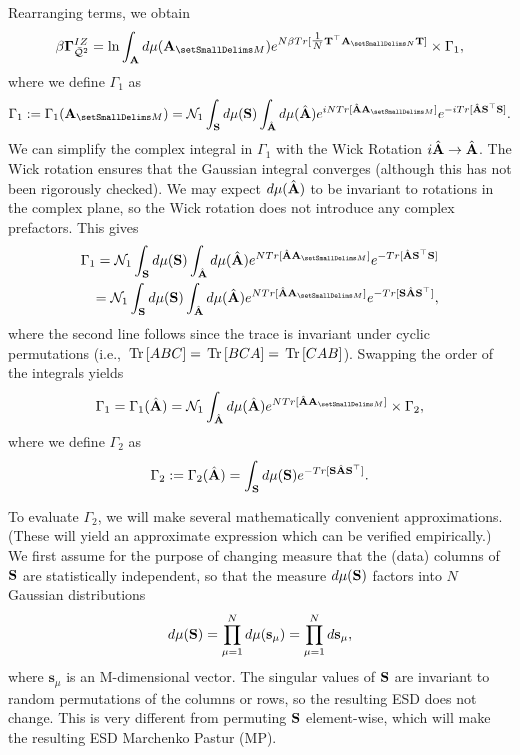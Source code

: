 Rearranging terms, we obtain 
\begin{align}
\label{eqn:IZG_Gamma1}
\IZG =  \ln\INTA  d\mu(\AMATM) 
            e^{  N\beta Tr[\tfrac{1}{N} \TMAT^{\top}\AMATN\TMAT ] } \times
           \Gamma_1,
\end{align}
where we define $\Gamma_1$ as 
\begin{align}
\Gamma_1 := \Gamma_1(\AMATM) 
         = \NORM_1 \INTS d\mu(\SMAT) 
                           \INTAHAT d\mu(\AHAT) e^{ iN Tr[ \AHAT\AMATM ] }
                                                           e^{ -i Tr[ \AHAT\SMAT^{\top} \SMAT ] } .
\end{align}
We can simplify the complex integral in $\Gamma_1$ with the Wick Rotation $i\hat{\mathbf{A}}\rightarrow\hat{\mathbf{A}}$.
The Wick rotation ensures that the Gaussian integral converges (although this has not been rigorously checked).
We may expect $d\mu(\hat{\mathbf{A}})$ to be invariant to rotations in the complex plane,
so the Wick rotation does not introduce any complex prefactors. This gives
\begin{eqnarray}
\label{eqn:QWick}
\Gamma_1 = \NORM_1 \INTS d\mu(\SMAT)\INTAHAT d\mu(\AHAT) 
           e^{ N  Tr[ \AHAT\AMATM ] }
           e^{ - Tr[ \AHAT\SMAT^{\top} \SMAT] } \\
\label{eqn:QWick2}
         = \NORM_1 \INTS d\mu(\SMAT)\INTAHAT d\mu(\AHAT) 
           e^{ N  Tr[ \AHAT\AMATM ] }
           e^{ -Tr[ \SMAT\AHAT\SMAT^{\top} ] } ,
\end{eqnarray}
where the second line follows since the trace is invariant under cyclic permutations (i.e., $\mbox{}\operatorname{Tr}\left[ABC\right]=\mbox{}\operatorname{Tr}\left[BCA\right]=\mbox{}\operatorname{Tr}\left[CAB\right]$).
Swapping the order of the integrals yields
\begin{eqnarray}
\label{eqn:QWick3}
\Gamma_1 =\Gamma_1(\AHAT)  = \NORM_1
           \INTAHAT d\mu(\AHAT) 
           e^{ N Tr[\AHAT\AMATM ]}\times
           \Gamma_2  ,
\end{eqnarray}
where we define $\Gamma_2$ as
\begin{equation*}
\Gamma_2 := \Gamma_2(\hat{\mathbf{A}})
         = \int_{{\mathbf{S}}} d\mu({\mathbf{S}})
           e^{ -Tr[ {\mathbf{S}}\hat{\mathbf{A}}{\mathbf{S}}^{\top} ] } .
\end{equation*}

To evaluate $\Gamma_2$, we will make several mathematically convenient approximations.
(These will yield an approximate expression which can be verified empirically.)
%
We first assume for the purpose of changing measure that the (data) columns of ${\mathbf{S}}$ are
statistically independent, so that the measure $d\mu({\mathbf{S}})$ factors into $N$ Gaussian distributions
\begin{align}
\label{eqn:dMuS}
d\mu({\mathbf{S}}) = \prod_{\mu=1}^{N}d\mu(\mathbf{s}_{\mu})=\prod_{\mu=1}^{N}d\mathbf{s}_{\mu} ,
\end{align}
where $\mathbf{s}_{\mu}$ is an M-dimensional vector.
The singular values of ${\mathbf{S}}$ are invariant to random permutations of the columns or rows,
so the resulting ESD does not change.  
This is very different from permuting ${\mathbf{S}}$ element-wise, which will make the resulting ESD Marchenko Pastur (MP).

